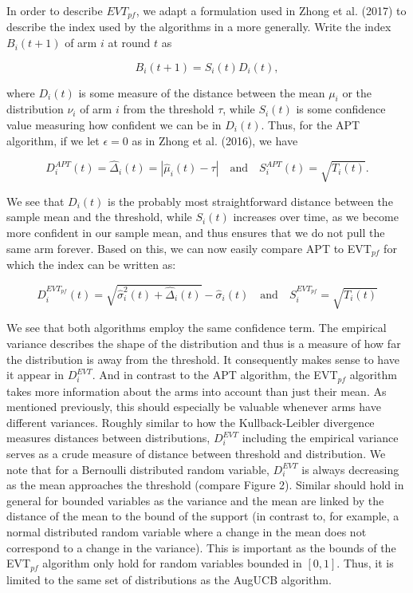 \documentclass[11pt,]{article}
\begin{document}
In order to describe \(EVT_{pf}\), we adapt a formulation used in Zhong
et al. (2017) to describe the index used by the algorithms in a more
generally. Write the index \(B_i(t+1)\) of arm \(i\) at round \(t\) as

\[
B_i(t+1) = S_i(t) D_i(t),
\]

where \(D_i(t)\) is some measure of the distance between the mean
\(\mu_i\) or the distribution \(\nu_i\) of arm \(i\) from the threshold
\(\tau\), while \(S_i(t)\) is some confidence value measuring how
confident we can be in \(D_i(t)\). Thus, for the APT algorithm, if we
let \(\epsilon = 0\) as in Zhong et al. (2016), we have

\[
D_i^{APT}(t) = \hat{\Delta}_i(t) = |\hat{\mu}_i(t) - \tau| \quad \text{and} \quad S_i^{APT}(t) = \sqrt{T_i(t)}.
\]

We see that \(D_i(t)\) is the probably most straightforward distance
between the sample mean and the threshold, while \(S_i(t)\) increases
over time, as we become more confident in our sample mean, and thus
ensures that we do not pull the same arm forever. Based on this, we can
now easily compare APT to EVT\(_{pf}\) for which the index can be
written as:

\[
D_i^{EVT_{pf}}(t) = \sqrt{\hat{\sigma}^2_{i}(t) + \hat{\Delta}_i(t)} - \hat{\sigma}_i(t) \quad \text{and} \quad S_i^{EVT_{pf}} = \sqrt{T_i(t)}
\]

We see that both algorithms employ the same confidence term. The
empirical variance describes the shape of the distribution and thus is a
measure of how far the distribution is away from the threshold. It
consequently makes sense to have it appear in \(D_i^{EVT}\). And in
contrast to the APT algorithm, the EVT\(_{pf}\) algorithm takes more
information about the arms into account than just their mean. As
mentioned previously, this should especially be valuable whenever arms
have different variances. Roughly similar to how the Kullback-Leibler
divergence measures distances between distributions, \(D_i^{EVT}\)
including the empirical variance serves as a crude measure of distance
between threshold and distribution. We note that for a Bernoulli
distributed random variable, \(D_i^{EVT}\) is always decreasing as the
mean approaches the threshold (compare Figure 2). Similar should hold in
general for bounded variables as the variance and the mean are linked by
the distance of the mean to the bound of the support (in contrast to,
for example, a normal distributed random variable where a change in the
mean does not correspond to a change in the variance). This is important
as the bounds of the EVT\(_{pf}\) algorithm only hold for random
variables bounded in \([0,1]\). Thus, it is limited to the same set of
distributions as the AugUCB algorithm.
\end{document}
